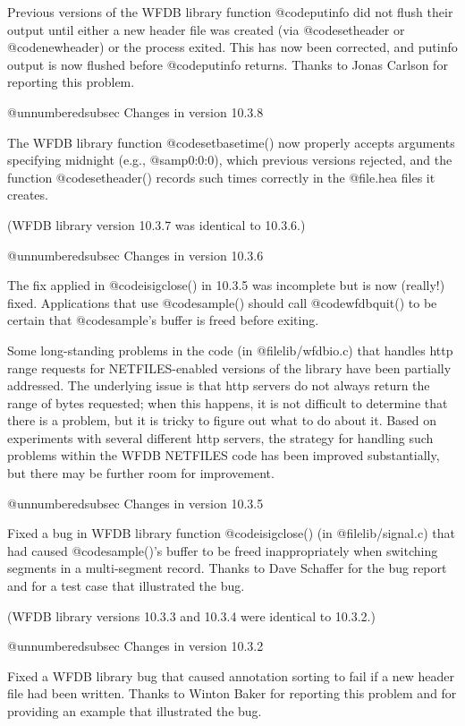 Previous versions of the WFDB library function @code{putinfo} did not
flush their output until either a new header file was created (via
@code{setheader} or @code{newheader}) or the process exited.  This has
now been corrected, and putinfo output is now flushed before
@code{putinfo} returns.  Thanks to Jonas Carlson for reporting this
problem.

@unnumberedsubsec Changes in version 10.3.8

The WFDB library function @code{setbasetime()} now properly
accepts arguments specifying midnight (e.g., @samp{0:0:0}), which previous
versions rejected, and the function @code{setheader()}
records such times correctly in the @file{.hea} files it creates.

(WFDB library version 10.3.7 was identical to 10.3.6.)

@unnumberedsubsec Changes in version 10.3.6

The fix applied in @code{isigclose()} in 10.3.5 was incomplete but is now
(really!) fixed.  Applications that use @code{sample()} should call 
@code{wfdbquit()} to be certain that @code{sample}'s buffer is freed before
exiting.

Some long-standing problems in the code (in @file{lib/wfdbio.c}) that handles
http range requests for NETFILES-enabled versions of the library have
been partially addressed.  The underlying issue is that http servers
do not always return the range of bytes requested;  when this happens,
it is not difficult to determine that there is a problem, but it is
tricky to figure out what to do about it.  Based on experiments with
several different http servers, the strategy for handling such problems
within the WFDB NETFILES code has been improved substantially, but
there may be further room for improvement.

@unnumberedsubsec Changes in version 10.3.5

Fixed a bug in WFDB library function @code{isigclose()} (in
@file{lib/signal.c}) that had caused @code{sample()}'s buffer to be freed
inappropriately when switching segments in a multi-segment record.
Thanks to Dave Schaffer for the bug report and for a test case that
illustrated the bug.

(WFDB library versions 10.3.3 and 10.3.4 were identical to 10.3.2.)

@unnumberedsubsec Changes in version 10.3.2

Fixed a WFDB library bug that caused annotation sorting to fail
if a new header file had been written.  Thanks to Winton Baker for
reporting this problem and for providing an example that illustrated
the bug.

